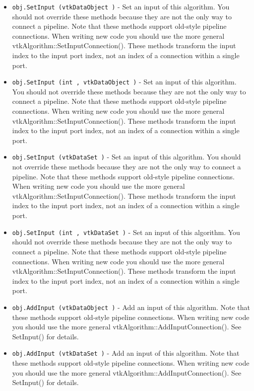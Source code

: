\begin{itemize}
\item  \verb|obj.SetInput (vtkDataObject )| -  Set an input of this algorithm. You should not override these
 methods because they are not the only way to connect a pipeline.
 Note that these methods support old-style pipeline connections.
 When writing new code you should use the more general
 vtkAlgorithm::SetInputConnection().  These methods transform the
 input index to the input port index, not an index of a connection
 within a single port.

\item  \verb|obj.SetInput (int , vtkDataObject )| -  Set an input of this algorithm. You should not override these
 methods because they are not the only way to connect a pipeline.
 Note that these methods support old-style pipeline connections.
 When writing new code you should use the more general
 vtkAlgorithm::SetInputConnection().  These methods transform the
 input index to the input port index, not an index of a connection
 within a single port.

\item  \verb|obj.SetInput (vtkDataSet )| -  Set an input of this algorithm. You should not override these
 methods because they are not the only way to connect a pipeline.
 Note that these methods support old-style pipeline connections.
 When writing new code you should use the more general
 vtkAlgorithm::SetInputConnection().  These methods transform the
 input index to the input port index, not an index of a connection
 within a single port.

\item  \verb|obj.SetInput (int , vtkDataSet )| -  Set an input of this algorithm. You should not override these
 methods because they are not the only way to connect a pipeline.
 Note that these methods support old-style pipeline connections.
 When writing new code you should use the more general
 vtkAlgorithm::SetInputConnection().  These methods transform the
 input index to the input port index, not an index of a connection
 within a single port.

\item  \verb|obj.AddInput (vtkDataObject )| -  Add an input of this algorithm.  Note that these methods support
 old-style pipeline connections.  When writing new code you should
 use the more general vtkAlgorithm::AddInputConnection().  See
 SetInput() for details.

\item  \verb|obj.AddInput (vtkDataSet )| -  Add an input of this algorithm.  Note that these methods support
 old-style pipeline connections.  When writing new code you should
 use the more general vtkAlgorithm::AddInputConnection().  See
 SetInput() for details.


\end{itemize}
